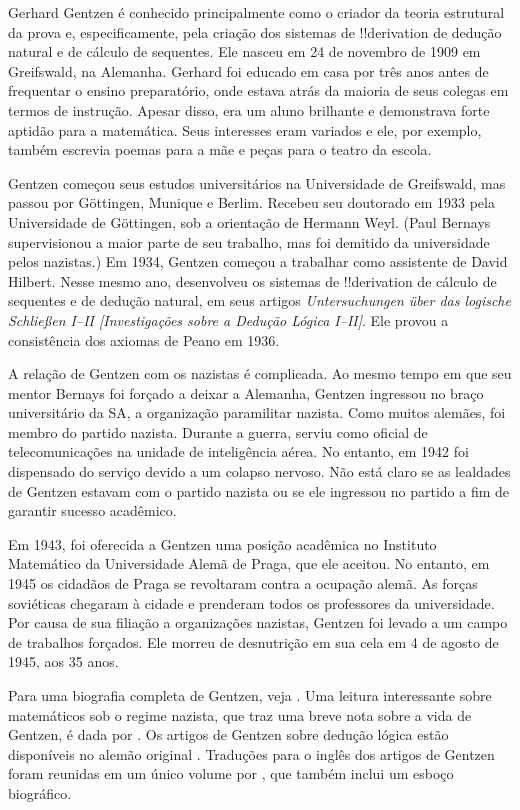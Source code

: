 \documentclass[../../../include/open-logic-section]{subfiles}
\begin{document}



Gerhard Gentzen é conhecido principalmente como o criador da teoria estrutural
da prova e, especificamente, pela criação dos sistemas de !!{derivation} de
dedução natural e de cálculo de sequentes. Ele nasceu em 24 de novembro de 1909
em Greifswald, na Alemanha. Gerhard foi educado em casa por três anos antes de
frequentar o ensino preparatório, onde estava atrás da maioria de seus colegas
em termos de instrução. Apesar disso, era um aluno brilhante e demonstrava
forte aptidão para a matemática. Seus interesses eram variados e ele, por
exemplo, também escrevia poemas para a mãe e peças para o teatro da escola.

Gentzen começou seus estudos universitários na Universidade de Greifswald,
mas passou por G\"{o}ttingen, Munique e Berlim. Recebeu seu doutorado em 1933
pela Universidade de G\"{o}ttingen, sob a orientação de Hermann Weyl. (Paul
Bernays supervisionou a maior parte de seu trabalho, mas foi demitido da
universidade pelos nazistas.) Em 1934, Gentzen começou a trabalhar como
assistente de David Hilbert. Nesse mesmo ano, desenvolveu os sistemas de
!!{derivation} de cálculo de sequentes e de dedução natural, em seus artigos
\emph{Untersuchungen \"{u}ber das logische Schlie\ss en I--II
  [Investigações sobre a Dedução Lógica I--II]}. Ele provou a
consistência dos axiomas de Peano em 1936.

A relação de Gentzen com os nazistas é complicada. Ao mesmo tempo em que seu
mentor Bernays foi forçado a deixar a Alemanha, Gentzen ingressou no braço
universitário da SA, a organização paramilitar nazista. Como muitos alemães,
foi membro do partido nazista. Durante a guerra, serviu como oficial de
telecomunicações na unidade de inteligência aérea. No entanto, em 1942 foi
dispensado do serviço devido a um colapso nervoso. Não está claro se as
lealdades de Gentzen estavam com o partido nazista ou se ele ingressou no
partido a fim de garantir sucesso acadêmico.

Em 1943, foi oferecida a Gentzen uma posição acadêmica no Instituto
Matemático da Universidade Alemã de Praga, que ele aceitou. No entanto, em
1945 os cidadãos de Praga se revoltaram contra a ocupação alemã. As forças
soviéticas chegaram à cidade e prenderam todos os professores da universidade.
Por causa de sua filiação a organizações nazistas, Gentzen foi levado a um
campo de trabalhos forçados. Ele morreu de desnutrição em sua cela em 4 de
agosto de 1945, aos 35 anos.

\begin{reading}
Para uma biografia completa de Gentzen, veja \citet{Menzler-Trott2007}. Uma
leitura interessante sobre matemáticos sob o regime nazista, que traz uma
breve nota sobre a vida de Gentzen, é dada por \citet{Segal2014}.
Os artigos de Gentzen sobre dedução lógica estão disponíveis no alemão
original \citep{Gentzen1935a,Gentzen1935b}. Traduções para o inglês dos
artigos de Gentzen foram reunidas em um único volume por
\citet{Gentzen1969}, que também inclui um esboço biográfico.
\end{reading}
\end{document}
